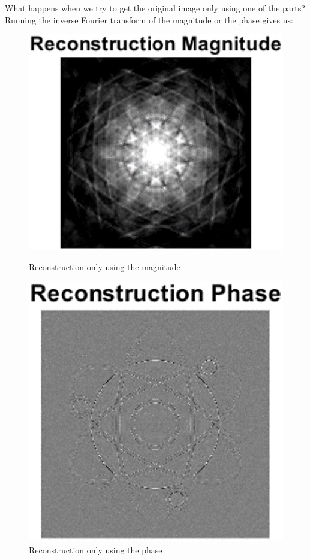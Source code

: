 \documentclass{article}
\begin{document}
What happens when we try to get the original image only using one of the parts? Running the inverse Fourier transform of the magnitude or the phase gives us:
\begin{figure}[!phbt]
\centering
	\begin{minipage}{.45\linewidth}
		\centering
    	\includegraphics[width= 0.92\linewidth]{img/magnituderecon.eps}
    	\caption{Reconstruction only using the magnitude}
    	\label{fig:magnituderecon}
    \end{minipage}
    \begin{minipage}{.45\linewidth}
    	\centering
    	\includegraphics[width= 0.8\linewidth]{img/phaserecon.eps}
    	\caption{Reconstruction only using the phase}
    	\label{fig:phaserecon}
    \end{minipage}
\end{figure}
\end{document}
